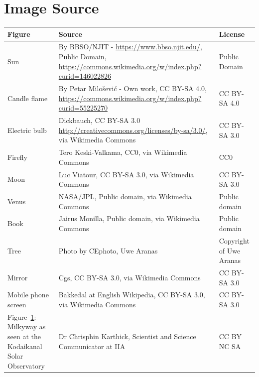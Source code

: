 \documentclass{xtufte-handout}
\begin{document}
\section{Image Source}
  \begin{longtable}{p{}p{}p{}} 
    \toprule
    Figure & Source & License\\
    \midrule  
        Sun & By BBSO/NJIT - \url{https://www.bbso.njit.edu/}, Public Domain, \url{https://commons.wikimedia.org/w/index.php?curid=146022826} & Public Domain\\
    \bottomrule  
        Candle flame & By Petar Milošević - Own work, CC BY-SA 4.0, \url{https://commons.wikimedia.org/w/index.php?curid=55225270} & CC BY-SA 4.0\\
    \bottomrule  
        Electric bulb & Dickbauch, CC BY-SA 3.0 \url{http://creativecommons.org/licenses/by-sa/3.0/}, via Wikimedia Commons & CC BY-SA 3.0\\
    \bottomrule  
    Firefly & Tero Keski-Valkama, CC0, via Wikimedia Commons &CC0\\
    \bottomrule  
    Moon & Luc Viatour, CC BY-SA 3.0, via Wikimedia Commons & CC BY-SA 3.0\\
    \bottomrule
    Venus & NASA/JPL, Public domain, via Wikimedia Commons & Public domain\\
    \bottomrule  
    Book & Jairus Monilla, Public domain, via Wikimedia Commons & Public domain\\
    \bottomrule
    Tree & Photo by CEphoto, Uwe Aranas & Copyright of Uwe Aranas\\
    \bottomrule  
    Mirror & Cgs, CC BY-SA 3.0, via Wikimedia Commons &CC BY-SA 3.0\\
    \bottomrule
    Mobile phone screen & Bakkedal at English Wikipedia, CC BY-SA 3.0, via Wikimedia Commons & CC BY-SA 3.0\\
    \bottomrule
    Figure~\ref{}: Milkyway as seen at the Kodaikanal Solar Observatory & Dr Chrisphin Karthick, Scientist and Science Communicator at IIA & CC BY NC SA\\
    \bottomrule  
  \end{longtable}
\end{document}

